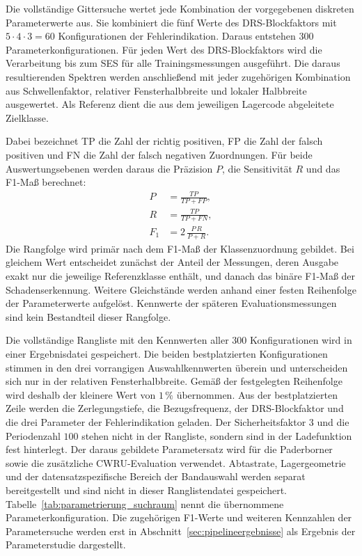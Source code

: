 Die vollständige Gittersuche wertet jede Kombination der vorgegebenen
diskreten Parameterwerte aus. Sie kombiniert die fünf Werte des
DRS-Blockfaktors mit $5\cdot4\cdot3=60$ Konfigurationen der
Fehlerindikation. Daraus entstehen 300 Parameterkonfigurationen. Für jeden
Wert des DRS-Blockfaktors wird die
Verarbeitung bis zum SES für alle Trainingsmessungen ausgeführt. Die daraus
resultierenden Spektren werden anschließend mit jeder zugehörigen Kombination
aus Schwellenfaktor, relativer Fensterhalbbreite und lokaler Halbbreite
ausgewertet. Als Referenz dient die aus dem jeweiligen Lagercode abgeleitete
Zielklasse.

Dabei bezeichnet \gls{TP} die Zahl der richtig positiven, \gls{FP} die Zahl
der falsch positiven und \gls{FN} die Zahl der falsch negativen Zuordnungen. Für beide
Auswertungsebenen werden daraus die Präzision $P$, die Sensitivität $R$ und das
F1-Maß berechnet:
\begin{equation}
    \begin{aligned}
        P &= \frac{TP}{TP+FP}, \\
        R &= \frac{TP}{TP+FN}, \\
        F_1 &= 2\,\frac{P\,R}{P+R}.
    \end{aligned}
    \label{eq:f1_mass}
\end{equation}
Die Rangfolge wird primär nach dem F1-Maß der Klassenzuordnung gebildet. Bei
gleichem Wert entscheidet zunächst der Anteil der Messungen, deren Ausgabe
exakt nur die jeweilige Referenzklasse enthält, und danach das binäre F1-Maß
der Schadenserkennung. Weitere Gleichstände werden anhand einer festen
Reihenfolge der Parameterwerte aufgelöst. Kennwerte der späteren
Evaluationsmessungen sind kein Bestandteil dieser Rangfolge.

Die vollständige Rangliste mit den Kennwerten aller 300 Konfigurationen wird
in einer Ergebnisdatei gespeichert. Die beiden bestplatzierten Konfigurationen
stimmen in den drei vorrangigen Auswahlkennwerten überein und unterscheiden
sich nur in der relativen Fensterhalbbreite. Gemäß der festgelegten
Reihenfolge wird deshalb der kleinere Wert von $1\,\%$ übernommen. Aus der
bestplatzierten Zeile werden die Zerlegungstiefe, die Bezugsfrequenz, der
DRS-Blockfaktor und die drei Parameter der Fehlerindikation geladen. Der
Sicherheitsfaktor $3$ und die Periodenzahl $100$ stehen nicht in der Rangliste,
sondern sind in der Ladefunktion fest hinterlegt. Der daraus gebildete
Parametersatz wird für die Paderborner sowie die zusätzliche CWRU-Evaluation
verwendet. Abtastrate, Lagergeometrie und der datensatzspezifische Bereich der
Bandauswahl werden separat bereitgestellt und sind nicht in dieser
Ranglistendatei gespeichert. Tabelle~\ref{tab:parametrierung_suchraum} nennt die
übernommene Parameterkonfiguration. Die zugehörigen F1-Werte und weiteren Kennzahlen der
Parametersuche werden erst in Abschnitt~\ref{sec:pipelineergebnisse} als
Ergebnis der Parameterstudie dargestellt.

